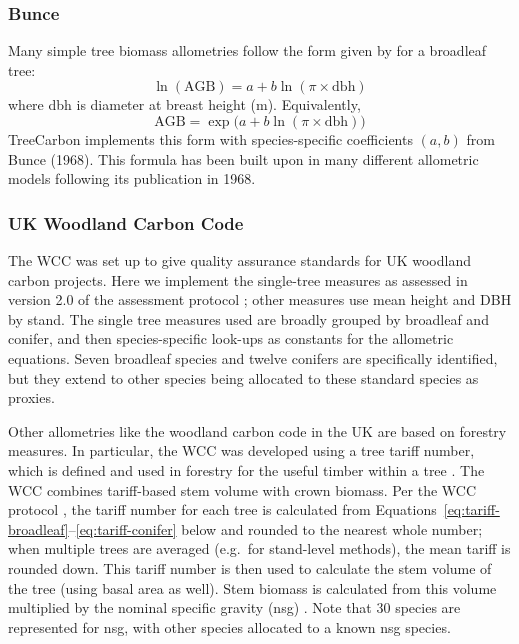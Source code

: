 \documentclass[12pt,a4paper]{article}
\begin{document}
\subsubsection{Bunce}

Many simple tree biomass allometries follow the form given by \citet{Bunce1968} for a broadleaf tree:
\begin{equation}
  \ln(\text{AGB}) = a + b \ln(\pi \times \text{dbh})
\end{equation}
where dbh is diameter at breast height (m). Equivalently,
\begin{equation}
  \text{AGB} = \exp\bigl(a + b \ln(\pi \times \text{dbh})\bigr)
\end{equation}
TreeCarbon implements this form with species-specific coefficients $(a, b)$ from Bunce (1968). This formula has been built upon in many different allometric models following its publication in 1968.

\subsubsection{UK Woodland Carbon Code}

The WCC was set up to give quality assurance standards for UK woodland carbon projects. Here we implement the single-tree measures as assessed in version 2.0 of the assessment protocol \citep{Jenkins2018}; other measures use mean height and DBH by stand. The single tree measures used are broadly grouped by broadleaf and conifer, and then species-specific look-ups as constants for the allometric equations. Seven broadleaf species and twelve conifers are specifically identified, but they extend to other species being allocated to these standard species as proxies.

Other allometries like the woodland carbon code in the UK are based on forestry measures. In particular, the WCC \citep{ForestryCommission2022} was developed using a tree tariff number, which is defined and used in forestry for the useful timber within a tree \citep{Matthews2006}. The WCC combines tariff-based stem volume with crown biomass. Per the WCC protocol \citep{Jenkins2018}, the tariff number for each tree is calculated from Equations~\ref{eq:tariff-broadleaf}--\ref{eq:tariff-conifer} below and rounded to the nearest whole number; when multiple trees are averaged (e.g.\ for stand-level methods), the mean tariff is rounded down. This tariff number is then used to calculate the stem volume of the tree (using basal area as well). Stem biomass is calculated from this volume multiplied by the nominal specific gravity (nsg) \citep{Lavers1983}. Note that 30 species are represented for nsg, with other species allocated to a known nsg species.
\end{document}
